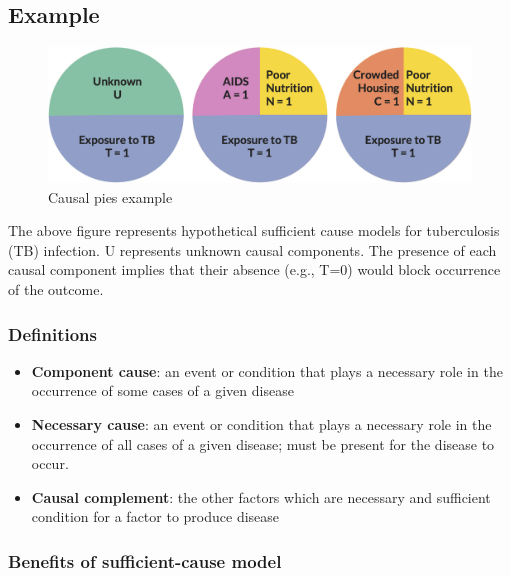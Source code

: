 \documentclass[
]{book}
\providecommand{\tightlist}{%
  \setlength{\itemsep}{0pt}\setlength{\parskip}{0pt}}
\begin{document}
\hypertarget{example}{%
\subsection{Example}\label{example}}

\begin{figure}

{\centering \includegraphics[width=1\linewidth]{img/causality/causal_pies_example} 

}

\caption{Causal pies example}\label{fig:unnamed-chunk-4}
\end{figure}

The above figure represents hypothetical sufficient cause models for tuberculosis (TB) infection. U represents unknown causal components. The presence of each causal component implies that their absence (e.g., T=0) would block occurrence of the outcome.

\hypertarget{definitions}{%
\subsubsection{Definitions}\label{definitions}}

\begin{itemize}
\tightlist
\item
  \textbf{Component cause}: an event or condition that plays a necessary role in the occurrence of some cases of a given disease
\item
  \textbf{Necessary cause}: an event or condition that plays a necessary role in the occurrence of all cases of a given disease; must be present for the disease to occur.
\item
  \textbf{Causal complement}: the other factors which are necessary and sufficient condition for a factor to produce disease
\end{itemize}

\hypertarget{benefits-of-sufficient-cause-model}{%
\subsubsection{Benefits of sufficient-cause model}\label{benefits-of-sufficient-cause-model}}
\end{document}
